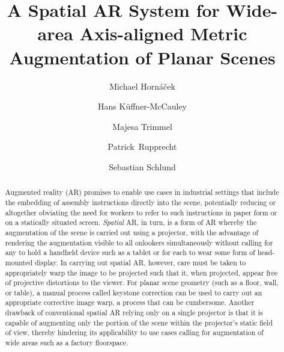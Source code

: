 \documentclass[review]{elsarticle}
\begin{document}
\begin{frontmatter}

\title{A Spatial AR System for Wide-area Axis-aligned Metric Augmentation of Planar Scenes} %

\author{Michael Horn\'{a}\v{c}ek}
\author{Hans K\"{u}ffner-McCauley}
\author{Majesa Trimmel}
\author{Patrick~Rupprecht}
\author{Sebastian Schlund}
\address{Human Centered Cyber Physical Production and Assembly Systems, Institute for Management Sciences, TU Wien, Vienna, Austria}

\begin{abstract}
Augmented reality (AR) promises to enable use cases in industrial settings that include the embedding of assembly instructions directly into the scene, potentially reducing or altogether obviating the need for workers to refer to such instructions in paper form or on a statically situated screen. \textit{Spatial} AR, in turn, is a form of AR whereby the augmentation of the scene is carried out using a projector, with the advantage of rendering the augmentation visible to all onlookers simultaneously without calling for any to hold a handheld device such as a tablet or for each to wear some form of head-mounted display. In carrying out spatial AR, however, care must be taken to appropriately warp the image to be projected such that it, when projected, appear free of projective distortions to the viewer. For planar scene geometry (such as a floor, wall, or table), a manual process called keystone correction can be used to carry out an appropriate corrective image warp, a process that can be cumbersome. Another drawback of conventional spatial AR relying only on a single projector is that it is capable of augmenting only the portion of the scene within the projector's static field of view, thereby hindering its applicability to use cases calling for augmentation of wide areas such as a factory floorspace.


\end{abstract}
\end{frontmatter}
\end{document}
